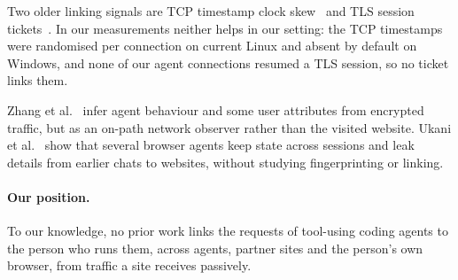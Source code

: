 Two older linking signals are TCP timestamp clock skew~\cite{kohno2005clock} and TLS session
tickets~\cite{sy2018tls}. In our measurements neither helps in our setting: the TCP timestamps were
randomised per connection on current Linux and absent by default on Windows, and none of our agent
connections resumed a TLS session, so no ticket links them.

Zhang et al.~\cite{zhang2025traffic} infer agent behaviour and some user attributes from encrypted
traffic, but as an on-path network observer rather than the visited website. Ukani
et al.~\cite{ukani2025privacy} show that several browser agents keep state across sessions and leak
details from earlier chats to websites, without studying fingerprinting or linking.

\paragraph{Our position.} To our knowledge, no prior work links the requests of tool-using coding
agents to the person who runs them, across agents, partner sites and the person's own browser, from
traffic a site receives passively.
